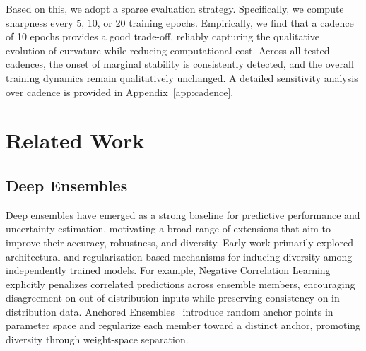 \documentclass[sigconf]{acmart}
\begin{document}
Based on this, we adopt a sparse evaluation strategy. Specifically, we compute sharpness every 5, 10, or 20 training epochs. Empirically, we find that a cadence of 10 epochs provides a good trade-off, reliably capturing the qualitative evolution of curvature while reducing computational cost. Across all tested cadences, the onset of marginal stability is consistently detected, and the overall training dynamics remain qualitatively unchanged. A detailed sensitivity analysis over cadence is provided in Appendix~\ref{app:cadence}.



\section{Related Work}\label{sec:related work}

\subsection{Deep Ensembles}

Deep ensembles have emerged as a strong baseline for predictive performance and uncertainty estimation, motivating a broad range of extensions that aim to improve their accuracy, robustness, and diversity. Early work primarily explored architectural and regularization-based mechanisms for inducing diversity among independently trained models. For example, Negative Correlation Learning~\citep{liu1999ensemble} explicitly penalizes correlated predictions across ensemble members, encouraging disagreement on out-of-distribution inputs while preserving consistency on in-distribution data. Anchored Ensembles~\citep{pearce2020uncertainty} introduce random anchor points in parameter space and regularize each member toward a distinct anchor, promoting diversity through weight-space separation.
\end{document}
